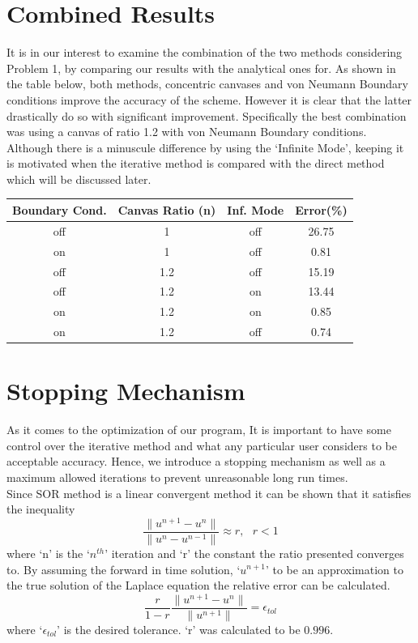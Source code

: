 \documentclass[a4paper]{article}
\begin{document}
\section{Combined Results}
It is in our interest to examine the combination of the two methods considering 
Problem 1, by comparing our results with the analytical ones for. As 
shown in the table below, both methods, concentric canvases and von Neumann 
Boundary conditions improve the accuracy of the scheme. However it is clear 
that the latter drastically do so with significant improvement. Specifically 
the best combination was using a canvas of ratio 1.2 with von Neumann Boundary 
conditions. Although there is a minuscule difference by using the `Infinite 
Mode', keeping it is motivated when the iterative method is compared with the 
direct method which will be discussed later.  
\begin{table}[h]
\centering
\begin{tabular}{c c c | c}
Boundary Cond. & Canvas Ratio (n) & Inf. Mode & Error(\%) \\
\hline
off & 1 & off & 26.75\\
 on & 1 & off & 0.81\\
off & 1.2 & off & 15.19\\
off & 1.2 & on & 13.44\\
on & 1.2 & on & 0.85 \\
on & 1.2 & off & 0.74 \\
\end{tabular}
\end{table}

\section{Stopping Mechanism}
As it comes to the optimization of our program,
It is important to have some control over the iterative method and what any 
particular user considers to be acceptable accuracy. Hence, we introduce a 
stopping mechanism as well as a maximum allowed iterations to prevent 
unreasonable long run times.\\

Since SOR method is a linear convergent method it can be shown that it 
satisfies the inequality 
\begin{equation}
\frac{\|u^{n+1}-u^{n} \|}{\|u^{n}-u^{n-1}\|} \approx r, \ \ \ r < 1
\end{equation}
where `n' is the `$n^{th}$' iteration and `r' the constant the ratio presented 
converges to.\cite{stop}
By assuming the forward in time solution, `$u^{n+1}$' to be an approximation to 
the true solution of the Laplace equation the relative error can be calculated. 
\begin{equation}
\frac{r}{1-r} \frac{\|u^{n+1}-u^{n} \|}{\|u^{n+1}\|} = \epsilon_{tol}
\end{equation}
where `$\epsilon_{tol}$' is the desired tolerance. `r' was calculated to be 
$0.996$. 
\end{document}
